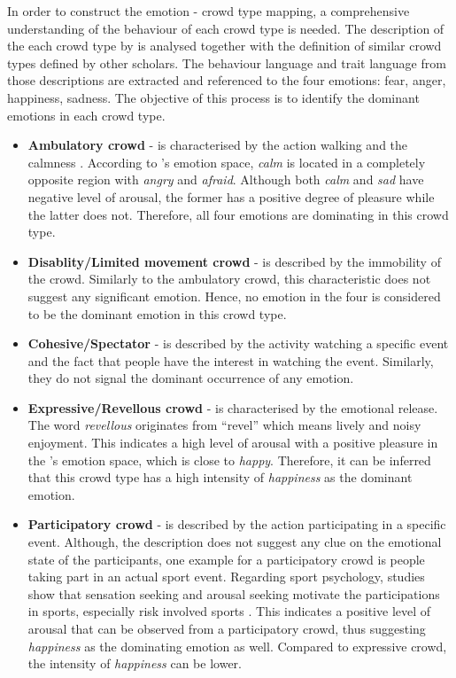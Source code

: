 In order to construct the emotion - crowd type mapping, a comprehensive understanding of the behaviour of each crowd type is needed. The description of the each crowd type by \citet{Berlonghi1995} is analysed together with the definition of similar crowd types defined by other scholars. The behaviour language and trait language from those descriptions are extracted and referenced to the four emotions: fear, anger, happiness, sadness. The objective of this process is to identify the dominant emotions in each crowd type. 

\begin{itemize}
\item \textbf{Ambulatory crowd} - is characterised by the action walking and the calmness \citep{Zeitz2009}. According to \citet{russell1980circumplex}'s emotion space, \textit{calm} is located in a completely opposite region with \textit{angry} and \textit{afraid}. Although both \textit{calm} and \textit{sad} have negative level of arousal, the former has a positive degree of pleasure while the latter does not. Therefore, all four emotions are dominating in this crowd type.
\item \textbf{Disablity/Limited movement crowd} - is described by the immobility of the crowd. Similarly to the ambulatory crowd, this characteristic does not suggest any significant emotion. Hence, no emotion in the four is considered to be the dominant emotion in this crowd type.
\item \textbf{Cohesive/Spectator} - is described by the activity watching a specific event and the fact that people have the interest in watching the event. Similarly, they do not signal the dominant occurrence of any emotion.
\item \textbf{Expressive/Revellous crowd} - is characterised by the emotional release. The word \textit{revellous} originates from ``revel'' which means lively and noisy enjoyment. This indicates a high level of arousal with a positive pleasure in the \citet{russell1980circumplex}'s emotion space, which is close to \textit{happy}. Therefore, it can be inferred that this crowd type has a high intensity of \textit{happiness} as the dominant emotion.
\item \textbf{Participatory crowd} - is described by the action participating in a specific event. Although, the description does not suggest any clue on the emotional state of the participants, one example for a participatory crowd is people taking part in an actual sport event. Regarding sport psychology, studies show that sensation seeking and arousal seeking motivate the participations in sports, especially risk involved sports \citep{rowland1986sensation}. This indicates a positive level of arousal that can be observed from a participatory crowd, thus suggesting \textit{happiness} as the dominating emotion as well. Compared to expressive crowd, the intensity of \textit{happiness} can be lower.

\end{itemize}
